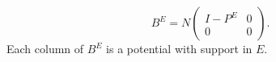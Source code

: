 $$B^E = N \begin{pmatrix} I - P^E & 0 \\ 0 & 0 \end{pmatrix}.$$
Each column of $B^E$ is a potential with support in $E$.
